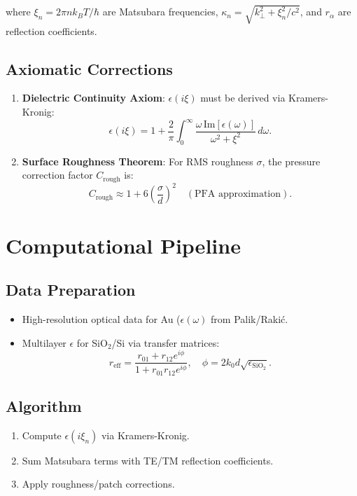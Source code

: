 \documentclass{article}
\begin{document}
where \(\xi_n = 2\pi n k_B T / \hbar\) are Matsubara frequencies, \(\kappa_n = \sqrt{k_{\perp}^2 + \xi_n^2/c^2}\), and \(r_\alpha\) are reflection coefficients. 

\subsection{Axiomatic Corrections}
\begin{enumerate}
    \item \textbf{Dielectric Continuity Axiom}: \(\epsilon(i\xi)\) must be derived via Kramers-Kronig:
    \begin{equation}
    \epsilon(i\xi) = 1 + \frac{2}{\pi} \int_0^\infty \frac{\omega \, \text{Im}[\epsilon(\omega)]}{\omega^2 + \xi^2} \, d\omega.
    \end{equation}
    
    \item \textbf{Surface Roughness Theorem}: For RMS roughness \(\sigma\), the pressure correction factor \(C_\text{rough}\) is:
    \begin{equation}
    C_\text{rough} \approx 1 + 6\left(\frac{\sigma}{d}\right)^2 \quad (\text{PFA approximation}).
    \end{equation}
\end{enumerate}

\section{Computational Pipeline}
\subsection{Data Preparation}
\begin{itemize}
    \item High-resolution optical data for Au (\(\epsilon(\omega)\) from Palik/Rakić.
    \item Multilayer \(\epsilon\) for SiO\(_2\)/Si via transfer matrices:
    \begin{equation}
    r_\text{eff} = \frac{r_{01} + r_{12} e^{i\phi}}{1 + r_{01} r_{12} e^{i\phi}}, \quad \phi = 2k_0 d \sqrt{\epsilon_{\text{SiO}_2}}.
    \end{equation}
\end{itemize}

\subsection{Algorithm}
\begin{enumerate}
    \item Compute \(\epsilon(i\xi_n)\) via Kramers-Kronig.
    \item Sum Matsubara terms with TE/TM reflection coefficients.
    \item Apply roughness/patch corrections.
\end{enumerate}
\end{document}
